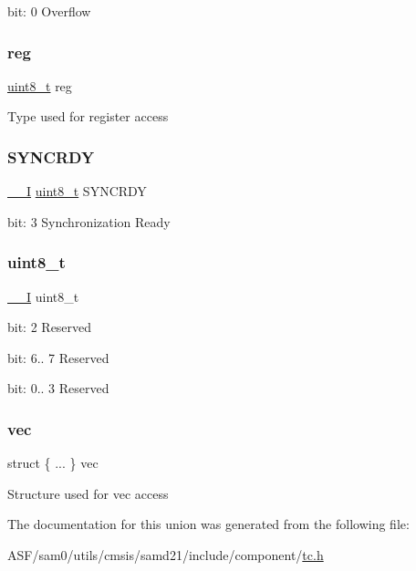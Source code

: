 bit\+: 0 Overflow \mbox{\label{union_t_c___i_n_t_f_l_a_g___type_a9428adc9af4653a2050e2536b55dec8d}} 
\subsubsection{\texorpdfstring{reg}{reg}}
{\footnotesize\ttfamily \mbox{\hyperlink{union_t_c___i_n_t_f_l_a_g___type_a5b4208c6f4c4a4290c4f2804d1eb1d5b}{uint8\+\_\+t}} reg}

Type used for register access \mbox{\label{union_t_c___i_n_t_f_l_a_g___type_ae8a10cfa0bb63130ae1e8150943d680b}} 
\subsubsection{\texorpdfstring{SYNCRDY}{SYNCRDY}}
{\footnotesize\ttfamily \mbox{\hyperlink{core__cm0plus_8h_af63697ed9952cc71e1225efe205f6cd3}{\+\_\+\+\_\+I}} \mbox{\hyperlink{union_t_c___i_n_t_f_l_a_g___type_a5b4208c6f4c4a4290c4f2804d1eb1d5b}{uint8\+\_\+t}} S\+Y\+N\+C\+R\+DY}

bit\+: 3 Synchronization Ready \mbox{\label{union_t_c___i_n_t_f_l_a_g___type_a5b4208c6f4c4a4290c4f2804d1eb1d5b}} 
\subsubsection{\texorpdfstring{uint8\_t}{uint8\_t}}
{\footnotesize\ttfamily \mbox{\hyperlink{core__cm0plus_8h_af63697ed9952cc71e1225efe205f6cd3}{\+\_\+\+\_\+I}} uint8\+\_\+t}

bit\+: 2 Reserved

bit\+: 6.. 7 Reserved

bit\+: 0.. 3 Reserved \mbox{\label{union_t_c___i_n_t_f_l_a_g___type_ad838eaead1519fe0a87d9b6631d9c735}} 
\subsubsection{\texorpdfstring{vec}{vec}}
{\footnotesize\ttfamily struct \{ ... \}   vec}

Structure used for vec access 

The documentation for this union was generated from the following file\+:\begin{DoxyCompactItemize}
\item 
A\+S\+F/sam0/utils/cmsis/samd21/include/component/\mbox{\hyperlink{utils_2cmsis_2samd21_2include_2component_2tc_8h}{tc.\+h}}\end{DoxyCompactItemize}
